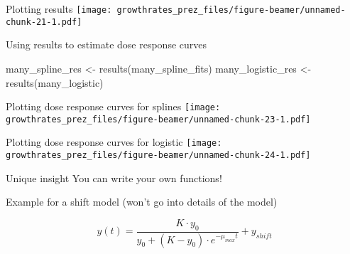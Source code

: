 \documentclass[
  ignorenonframetext,
]{beamer}
\newenvironment{Shaded}{\begin{snugshade}}{\end{snugshade}}
\newcommand{\FunctionTok}[1]{\textcolor[rgb]{0.00,0.00,0.00}{#1}}
\newcommand{\NormalTok}[1]{#1}
\newcommand{\OtherTok}[1]{\textcolor[rgb]{0.56,0.35,0.01}{#1}}
\begin{document}
\begin{frame}{Plotting results}
\protect\hypertarget{plotting-results}{}
\texttt{[image: growthrates\_prez\_files/figure-beamer/unnamed-chunk-21-1.pdf]}
\end{frame}

\begin{frame}[fragile]{Using results to estimate dose response curves}
\protect\hypertarget{using-results-to-estimate-dose-response-curves}{}
\begin{Shaded}
\begin{Highlighting}[]
\NormalTok{many\_spline\_res   }\OtherTok{\textless{}{-}} \FunctionTok{results}\NormalTok{(many\_spline\_fits)}
\NormalTok{many\_logistic\_res }\OtherTok{\textless{}{-}} \FunctionTok{results}\NormalTok{(many\_logistic)}
\end{Highlighting}
\end{Shaded}
\end{frame}

\begin{frame}{Plotting dose response curves for splines}
\protect\hypertarget{plotting-dose-response-curves-for-splines}{}
\texttt{[image: growthrates\_prez\_files/figure-beamer/unnamed-chunk-23-1.pdf]}
\end{frame}

\begin{frame}{Plotting dose response curves for logistic}
\protect\hypertarget{plotting-dose-response-curves-for-logistic}{}
\texttt{[image: growthrates\_prez\_files/figure-beamer/unnamed-chunk-24-1.pdf]}
\end{frame}

\begin{frame}{Unique insight}
\protect\hypertarget{unique-insight}{}
You can write your own functions!

Example for a shift model (won't go into details of the model)

\[y(t) = \frac{K \cdot y_0}{y_0 + (K-y_0) \cdot e^{-\mu_{max}t}} + y_{shift}\]
\end{frame}
\end{document}
